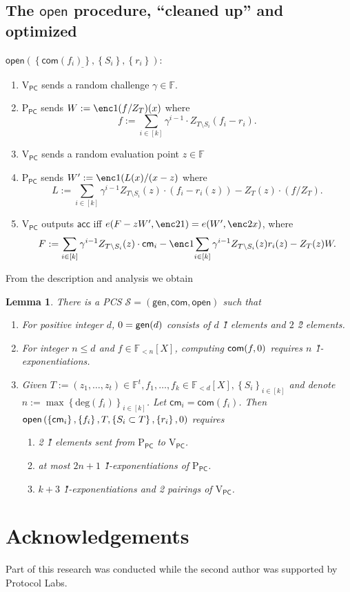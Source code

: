 \documentclass[11pt]{article} %
\newcommand{\F}{\ensuremath{\mathbb F}\xspace}
\newcommand{\com}{\ensuremath{\mathsf{com}}\xspace}
\newcommand{\cm}{\ensuremath{\mathsf{cm}}\xspace}
\newcommand{\open}{\ensuremath{\mathsf{open}}\xspace}
\renewcommand{\deg}{\ensuremath{\mathrm{deg}}\xspace}
\newcommand{\acc}{\ensuremath{\mathsf{acc}}\xspace}
\newcommand{\defeq}{:=}
\newcommand{\sett}[2]{\ensuremath{\set{#1}_{#2}}\xspace}
\newcommand{\gen}{\ensuremath{\mathsf{gen}}\xspace}
\newcommand{\prvpc}{\ensuremath{\mathrm{P_{\mathsf{PC}}}}\xspace}
\newcommand{\verpc}{\ensuremath{\mathrm{V_{\mathsf{PC}}}}\xspace}
\newcommand{\set}[1]{\ensuremath{\left\{#1\right\}}\xspace}
\newcommand{\polysofdeg}[1]{\ensuremath{\F_{< #1}[X]}\xspace}
\newcommand{\PCscheme}{\ensuremath{\mathscr{S}}\xspace}
\newtheorem{lemma}{Lemma}[section]
\begin{document}
 
 \subsection{The \open procedure, ``cleaned up'' and optimized}
 
$\underline{\open(\set{\com(f_i)},\set{S_i},\set{r_i})}$:
     \begin{enumerate}
    \item \verpc sends a random challenge $\gamma\in \F$.
    \item\label{stp:W} \prvpc sends $W\defeq \enc1{(f/Z_T)(x)}$ where
    \[f\defeq \sum_{i\in [k]} \gamma^{i-1}\cdot  Z_{T\setminus S_i}(f_i-r_i).\]
    \item \verpc sends a random evaluation point $z\in \F$
    \item\label{step:W'} \prvpc sends $W'\defeq \enc1{(L(x)/(x-z)}$ where
    \[L\defeq \sum_{i\in [k]} \gamma^{i-1}Z_{T\setminus S_i}(z)\cdot (f_i-r_i(z)) - Z_T(z)\cdot (f/Z_T).\]
    \item \verpc outputs \acc iff $e(F-zW',\enc2{1}) = e(W',\enc2{x})$,
where     \[F\defeq \sum_{i\in [k]} \gamma^{i-1}  Z_{T\setminus S_i}(z)\cdot \cm_i - \enc1{\sum_{i\in [k]} \gamma^{i-1} Z_{T\setminus S_i}(z)r_i(z)} - Z_T(z)W.\]
    \end{enumerate}

From the description and analysis we obtain 
\begin{lemma}\label{lem:multikateG1}
There is a PCS $\PCscheme=(\gen,\com,\open)$ such that
  \begin{enumerate}
\item For positive integer $d$, $\srs0=\gen(d)$ consists of $d$ \G1 elements and $2$ \G2 elements.
  \item For integer $n\leq d$ and $f\in \polysofdeg{n}$, computing $\com(f,\srs0)$ requires $n$ \G1-exponentiations.
   \item Given $T \defeq (z_1,\ldots,z_t)\in \F^t, f_1,\ldots, f_k \in \polysofdeg{d}, \sett{S_i}{i\in [k]}$   and denote $n \defeq \max\sett{\deg(f_i)}{i\in [k]}$.
   Let $\cm_i = \com(f_i)$.
   Then $\open\left(\set{\cm_i},\set{f_i},T,\set{S_i\subset T},\set{r_i},\srs0 \right)$ requires

    \begin{enumerate}
    \item 2 \G1 elements sent from \prvpc to \verpc.
    \item at most $2n+1$ \G1-exponentiations of \prvpc.
    \item $k+3$ \G1-exponentiations and 2 pairings of \verpc.
\end{enumerate}
\end{enumerate}


\end{lemma}

\section*{Acknowledgements}
Part of this research was conducted while the second author was supported by Protocol Labs.


\end{document}
